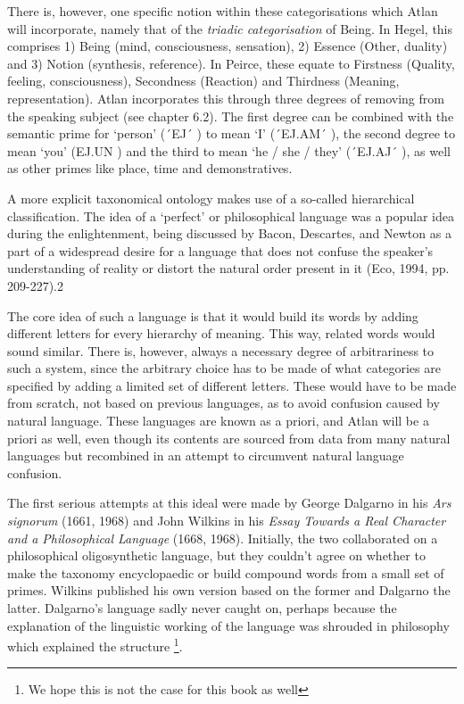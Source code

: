 There is, however, one specific notion within these categorisations which Atlan will incorporate, namely that of the {\it triadic categorisation} of Being. In Hegel, this comprises 1) Being (mind, consciousness, sensation), 2) Essence (Other, duality) and 3) Notion (synthesis, reference). In Peirce, these equate to Firstness (Quality, feeling, consciousness), Secondness (Reaction) and Thirdness (Meaning, representation). Atlan incorporates this through three degrees of removing from the speaking subject (see chapter 6.2). The first degree can be combined with the semantic prime for ‘person’ (´EJ´ \ej) to mean ‘I’ (´EJ.AM´ \ej \am), the second degree to mean ‘you’ (EJ.UN \ej \un) and the third to mean ‘he / she / they’ (´EJ.AJ´ \ej \aj), as well as other primes like place, time and demonstratives. 

A more explicit taxonomical ontology makes use of a so-called hierarchical classification. The idea of a ‘perfect’ or philosophical language was a popular idea during the enlightenment, being discussed by Bacon, Descartes, and Newton as a part of a widespread desire for a language that does not confuse the speaker’s understanding of reality or distort the natural order present in it (Eco, 1994, pp. 209-227).2 

The core idea of such a language is that it would build its words by adding different letters for every hierarchy of meaning. This way, related words would sound similar. There is, however, always a necessary degree of arbitrariness to such a system, since the arbitrary choice has to be made of what categories are specified by adding a limited set of different letters. These would have to be made from scratch, not based on previous languages, as to avoid confusion caused by natural language. These languages are known as a priori, and Atlan will be a priori as well, even though its contents are sourced from data from many natural languages but recombined in an attempt to circumvent natural language confusion.  

The first serious attempts at this ideal were made by George Dalgarno in his {\it Ars signorum} (1661, 1968) and John Wilkins in his \textit{Essay Towards a Real Character and a Philosophical Language} (1668, 1968). Initially, the two collaborated on a philosophical oligosynthetic language, but they couldn’t agree on whether to make the taxonomy encyclopaedic or build compound words from a small set of primes. Wilkins published his own version based on the former and Dalgarno the latter. Dalgarno’s language sadly never caught on, perhaps because the explanation of the linguistic working of the language was shrouded in philosophy which explained the structure \footnote{We hope this is not the case for this book as well}. 

